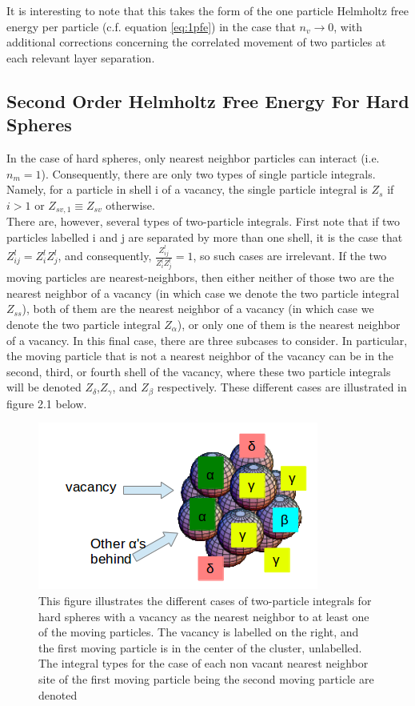\documentclass[paper=a4, fontsize=11pt]{scrartcl} %
\numberwithin{equation}{section} %
\numberwithin{figure}{section} %
\numberwithin{table}{section} %
\begin{document}
It is interesting to note that this takes the form of the one particle
Helmholtz free energy per particle (c.f. equation \ref{eq:1pfe}) in the case
that $n_v \rightarrow 0$, with additional corrections concerning
the correlated movement of two particles at each relevant layer separation.

\subsection{Second Order Helmholtz Free Energy For Hard Spheres}
In the case of hard spheres, only nearest neighbor particles can interact
(i.e. $n_m = 1$).
Consequently, there are only two types of single
particle integrals.  Namely, for a particle in shell i of a vacancy, the
single particle integral is $Z_s$ if $i > 1$ or $Z_{sv,1} \equiv Z_{sv}$
otherwise.\\

There are, however, several types of two-particle integrals.
First note that if two particles labelled i and j are separated by more than one shell,
it is the case that $Z_{ij}^l = Z_{i}^lZ_{j}^l$, and consequently,
$\frac{Z_{ij}^l}{Z_i^lZ_j^l} = 1$, so such cases are irrelevant.
If the two moving particles are nearest-neighbors, then either neither of
those two are the nearest neighbor of a vacancy (in which case we denote
the two particle integral $Z_{ss}$), both of them are the nearest neighbor of
a vacancy (in which case we denote the two particle integral $Z_\alpha$), or
only one of them is the nearest neighbor of a vacancy.  In this final case,
there are three subcases to consider.  In particular, the moving particle that
is not a nearest neighbor of the vacancy can be in the second, third, or 
fourth shell of the vacancy, where these two particle integrals will be
denoted $Z_\delta$,$Z_\gamma$, and $Z_\beta$ respectively.  These different 
cases are illustrated in figure 2.1 below.

\begin{figure}[H]
  \centering
  \label{fig:int-labels}
  \includegraphics[scale=0.75]{integral_labels.png}
  \caption{This figure illustrates the different cases of two-particle
           integrals for hard spheres with a vacancy as the nearest neighbor
           to at least one of the moving particles. The vacancy is labelled
           on the right, and the first moving particle is in the center of
           the cluster, unlabelled.  The integral types for the case of each
           non vacant nearest neighbor site of the first moving particle
           being the second moving particle are denoted}
\end{figure}
\end{document}
